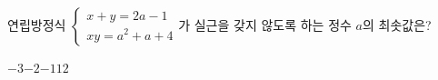 연립방정식 $\begin{cases} x+y=2a-1 \\ xy=a^2+a+4 \end{cases}$가 실근을 갖지 않도록 하는 정수 $a$의 최솟값은?
\begin{choices32}{$-3$}{$-2$}{$-1$}{$1$}{$2$}\end{choices32}
